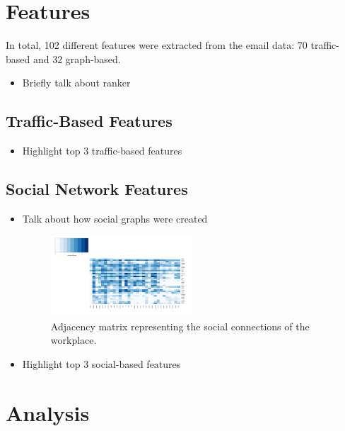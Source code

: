 \documentclass{article}
\begin{document}
\section{Features} \label{Features}
In total, 102 different features were extracted from the email data: 70 traffic-based and 32 graph-based.
\begin{itemize}
\item Briefly talk about ranker
\end{itemize}
\subsection{Traffic-Based Features}
\begin{itemize}
\item Highlight top 3 traffic-based features
\end{itemize}
\subsection{Social Network Features}
\begin{itemize}
\item Talk about how social graphs were created
\begin{figure}[H]
    \centering
        \includegraphics[width=0.5\textwidth]{adj_matrix}
        \caption{Adjacency matrix representing the social connections of the workplace.}
        \label{fig:var_imp}
\end{figure}
\item Highlight top 3 social-based features
\end{itemize}

\section{Analysis} \label{Analysis}
\end{document}
